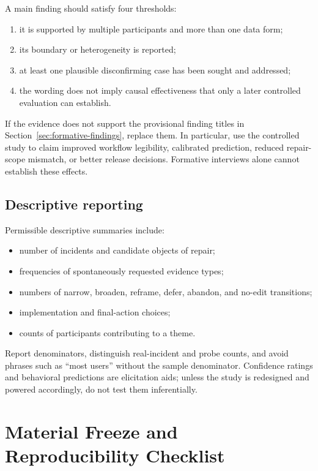 A main finding should satisfy four thresholds:

\begin{enumerate}[leftmargin=*]
    \item it is supported by multiple participants and more than one data form;
    \item its boundary or heterogeneity is reported;
    \item at least one plausible disconfirming case has been sought and
    addressed;
    \item the wording does not imply causal effectiveness that only a later
    controlled evaluation can establish.
\end{enumerate}

If the evidence does not support the provisional finding titles in
Section~\ref{sec:formative-findings}, replace them. In particular, use the
controlled study to claim improved workflow legibility, calibrated prediction,
reduced repair-scope mismatch, or better release decisions. Formative interviews
alone cannot establish these effects.

\subsection{Descriptive reporting}

Permissible descriptive summaries include:

\begin{itemize}[leftmargin=*]
    \item number of incidents and candidate objects of repair;
    \item frequencies of spontaneously requested evidence types;
    \item numbers of narrow, broaden, reframe, defer, abandon, and no-edit
    transitions;
    \item implementation and final-action choices;
    \item counts of participants contributing to a theme.
\end{itemize}

Report denominators, distinguish real-incident and probe counts, and avoid
phrases such as ``most users'' without the sample denominator. Confidence
ratings and behavioral predictions are elicitation aids; unless the study is
redesigned and powered accordingly, do not test them inferentially.

\section{Material Freeze and Reproducibility Checklist}
\label{app:freeze}

